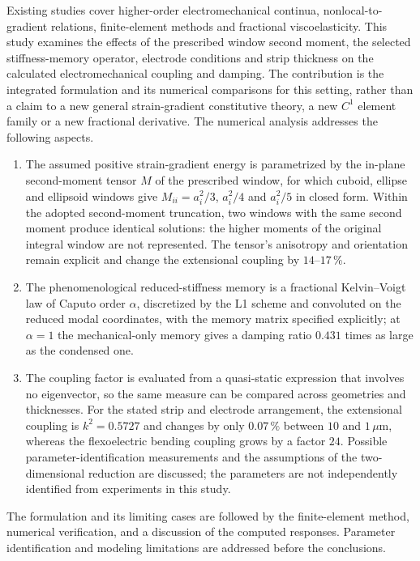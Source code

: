 Existing studies cover higher-order electromechanical continua,
nonlocal-to-gradient relations, finite-element methods and fractional
viscoelasticity. This study examines the effects of the prescribed window second moment,
the selected stiffness-memory operator, electrode conditions and strip
thickness on the calculated electromechanical coupling and damping. The contribution is the integrated formulation and its
numerical comparisons for this setting, rather than a claim to a new general
strain-gradient constitutive theory, a new $C^1$ element family or a new
fractional derivative. The numerical analysis addresses the following aspects.

\begin{enumerate}
\item The assumed positive strain-gradient energy is parametrized by the
  in-plane second-moment tensor $M$ of the prescribed window, for which cuboid,
  ellipse and ellipsoid windows give $M_{ii}=a_i^{2}/3$, $a_i^{2}/4$ and
  $a_i^{2}/5$ in closed form. Within the adopted second-moment truncation, two windows
  with the same second moment produce identical solutions: the higher
  moments of the original integral window are not represented. The tensor's
  anisotropy and orientation remain explicit and change the extensional coupling by
  $14$--$17\,\%$.
\item The phenomenological reduced-stiffness memory is a fractional Kelvin--Voigt law of Caputo order
  $\alpha$, discretized by the L1 scheme and convoluted on the reduced modal
  coordinates, with the memory matrix specified explicitly; at $\alpha=1$ the mechanical-only memory gives a damping ratio $0.431$ times as large
  as the condensed one.
\item The coupling factor is
  evaluated from a quasi-static expression that involves no eigenvector, so the
  same measure can be compared across geometries and thicknesses. For the stated
  strip and electrode arrangement, the extensional coupling is $k^{2}=0.5727$ and changes by only $0.07\,\%$ between $10$
  and $1\,\mu$m, whereas the flexoelectric bending coupling grows by a
  factor $24$. Possible parameter-identification measurements and the assumptions of
  the two-dimensional reduction are discussed; the parameters
  are not independently identified from experiments in this study.
\end{enumerate}

The formulation and its limiting cases are followed by the finite-element
method, numerical verification, and a discussion of the computed responses.
Parameter identification and modeling limitations are addressed before the
conclusions.

\FloatBarrier
